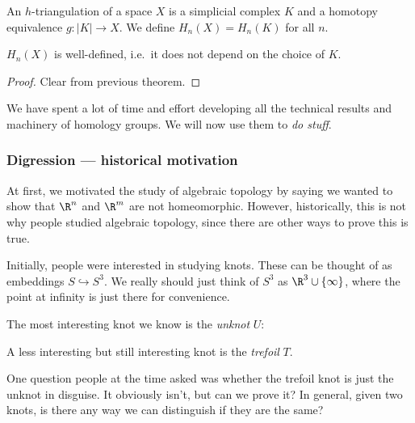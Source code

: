 \documentclass[a4paper]{article}
\begin{document}
\begin{defi}
  An $h$-triangulation of a space $X$ is a simplicial complex $K$ and a homotopy equivalence $g: |K| \to X$. We define $H_n(X) = H_n(K)$ for all $n$.
\end{defi}

\begin{lemma}
  $H_n(X)$ is well-defined, i.e.\ it does not depend on the choice of $K$.
\end{lemma}

\begin{proof}
  Clear from previous theorem.
\end{proof}

We have spent a lot of time and effort developing all the technical results and machinery of homology groups. We will now use them to \emph{do stuff}.

\subsubsection*{Digression --- historical motivation}
At first, we motivated the study of algebraic topology by saying we wanted to show that $\R^n$ and $\R^m$ are not homeomorphic. However, historically, this is not why people studied algebraic topology, since there are other ways to prove this is true.

Initially, people were interested in studying knots. These can be thought of as embeddings $S \hookrightarrow S^3$. We really should just think of $S^3$ as $\R^3 \cup \{\infty\}$, where the point at infinity is just there for convenience.

The most interesting knot we know is the \emph{unknot} $U$:
\begin{center}
\end{center}
A less interesting but still interesting knot is the \emph{trefoil} $T$.
\begin{center}
\end{center}
One question people at the time asked was whether the trefoil knot is just the unknot in disguise. It obviously isn't, but can we prove it? In general, given two knots, is there any way we can distinguish if they are the same?
\end{document}
